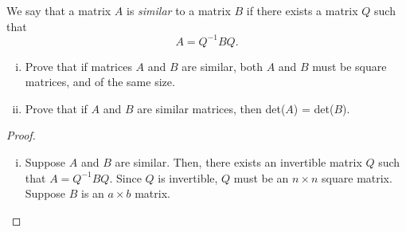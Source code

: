 \begin{question}
	\normalfont We say that a matrix $A$ is \emph{similar} to a matrix $B$ if there exists a matrix $Q$ such that 
	\[
	A = Q^{-1}BQ.
	\]
	\begin{enumerate}[(i)]
	\item Prove that if matrices $A$ and $B$ are similar, both $A$ and $B$ must be square matrices, and of the same size. 
	\vspace{.1cm}	
\item	Prove that if $A$ and $B$ are similar matrices, then det($A$) = det($B$). 
	\end{enumerate}	
	\end{question}
\begin{proof}
	\renewcommand{\qedsymbol}{$\blacksquare$}
	\begin{enumerate}[(i)]
		\item Suppose $A$ and $B$ are similar.
		Then, there exists an invertible matrix $Q$ such that $A=Q^{-1}BQ$.
		Since $Q$ is invertible, $Q$ must be an $n\times n$ square matrix.
		Suppose $B$ is an $a\times b$ matrix.
		
 	\end{enumerate}
	\renewcommand{\qedsymbol}{}
\end{proof}